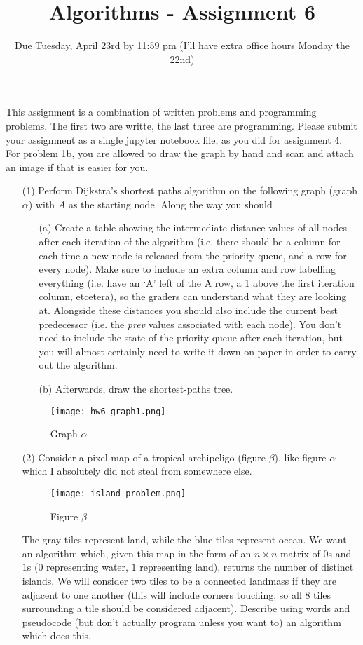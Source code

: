 \documentclass[12pt]{article}
\title{Algorithms - Assignment 6}
\date{Due Tuesday, April 23rd by 11:59 pm (I'll have extra office hours Monday the 22nd)}
\begin{document}
\maketitle

This assignment is a combination of written problems and programming problems. The first two are writte, the last three are programming. Please submit your assignment as a single jupyter notebook file, as you did for assignment 4. For problem 1b, you are allowed to draw the graph by hand and scan and attach an image if that is easier for you.  

\begin{enumerate}
    \item[(1)] Perform Dijkstra's shortest paths algorithm on the following graph (graph $\alpha$) with $A$ as the starting node. Along the way you should
    \begin{itemize}
        \item[(a)] Create a table showing the intermediate distance values of all nodes after each iteration of the algorithm (i.e. there should be a column for each time a new node is released from the priority queue, and a row for every node). Make sure to include an extra column and row labelling everything (i.e. have an `A' left of the A row, a 1 above the first iteration column, etcetera), so the graders can understand what they are looking at. Alongside these distances you should also include the current best predecessor (i.e. the \emph{prev} values associated with each node). You don't need to include the state of the priority queue after each iteration, but you will almost certainly need to write it down on paper in order to carry out the algorithm.
        \item[(b)] Afterwards, draw the shortest-paths tree. 
    \end{itemize}
    \begin{figure}[h]
        \centering
        \texttt{[image: hw6\_graph1.png]}
        \caption{Graph $\alpha$}
    \end{figure}

    \item[(2)] Consider a pixel map of a tropical archipeligo (figure $\beta$), like figure $\alpha$ which I absolutely did not steal from somewhere else.
        \begin{figure}[h]
            \centering
            \texttt{[image: island\_problem.png]}
            \caption{Figure $\beta$}
        \end{figure}
    The gray tiles represent land, while the blue tiles represent ocean. We want an algorithm which, given this map in the form of an $n \times n$ matrix of $0$s and $1$s ($0$ representing water, $1$ representing land), returns the number of distinct islands. We will consider two tiles to be a connected landmass if they are adjacent to one another (this will include corners touching, so all 8 tiles surrounding a tile should be considered adjacent). Describe using words and pseudocode (but don't actually program unless you want to) an algorithm which does this. \par 
    

\end{enumerate}
\end{document}
